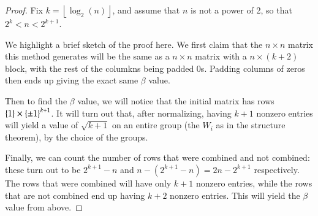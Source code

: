 \documentclass[12pt]{article}
\theoremstyle{definitionstyle}
\newcommand{\floor}[1]{\left\lfloor#1\right\rfloor}
\newcommand{\SET}[1]{\Set{\mskip-\medmuskip #1 \mskip-\medmuskip}}
\begin{document}
\begin{proof}
Fix $k = \floor{\log_2(n)}$, and assume that $n$ is not a power of 2, so that $2^k < n < 2^{k+1}$. 

We highlight a brief sketch of the proof here. We first claim that the $n \times n$ matrix this method generates will be the same as a $n \times n$ matrix with a $n \times (k+2)$ block, with the rest of the columkns being padded 0s. Padding columns of zeros then ends up giving the exact same $\beta$ value. 

Then to find the $\beta$ value, we will notice that the initial matrix has rows $\SET{1} \times \SET{\pm 1}^{k+1}$. It will turn out that, after normalizing, having $k+1$ nonzero entries will yield a value of $\sqrt{k+1}$ on an entire group (the $W_i$ as in the structure theorem), by the choice of the groups. 

Finally, we can count the number of rows that were combined and not combined: these turn out to be $2^{k+1} - n$ and $n - (2^{k+1} - n) = 2n - 2^{k+1}$ respectively. The rows that were combined will have only $k+1$ nonzero entries, while the rows that are not combined end up having $k+2$ nonzero entries. This will yield the $\beta$ value from above. 





\end{proof}
\end{document}
